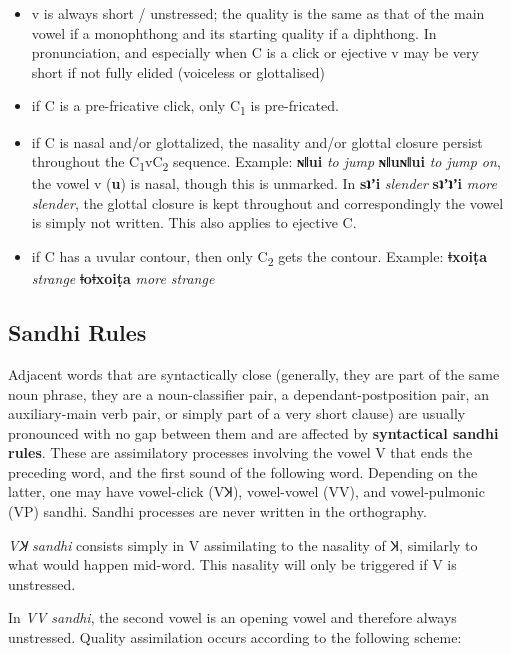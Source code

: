 \documentclass[11pt,a5paper]{book}
\newcommand{\qcn}[1]{\textcolor{AccentText}{\large\textbf{#1}}}
\newcommand{\transl}[2]{\qcn{#1} \emph{#2}}
\begin{document}
\begin{itemize}
	\item v is always short / unstressed; the quality is the same as that of the main vowel if a monophthong and its starting quality if a diphthong. In pronunciation, and especially when C is a click or ejective v may be very short if not fully elided (voiceless or glottalised)
	\item if C is a pre-fricative click, only C\textsubscript{1} is pre-fricated.
	\item if C is nasal and/or glottalized, the nasality and/or glottal closure persist throughout the C\textsubscript{1}vC\textsubscript{2} sequence. Example: \transl{ɴǁui}{to jump} \textrightarrow \transl{ɴǁuɴǁui}{to jump on}, the vowel v (\qcn{u}) is nasal, though this is unmarked. In \transl{sʇʼi}{slender} \textrightarrow \transl{sʇʼʇʼi}{more slender}, the glottal closure is kept throughout and correspondingly the vowel is simply not written. This also applies to ejective C.
	\item if C has a uvular contour, then only C\textsubscript{2} gets the contour. Example: \transl{ǂxoiṭa}{strange} \textrightarrow \transl{ǂoǂxoiṭa}{more strange}
\end{itemize}

\subsection{Sandhi Rules}

Adjacent words that are syntactically close (generally, they are part of the same noun phrase, they are a noun-classifier pair, a de\-pen\-dant-post\-po\-si\-tion pair, an auxiliary-main verb pair, or simply part of a very short clause) are usually pronounced with no gap between them and are affected by \textbf{syntactical sandhi rules}.  These are assimilatory processes involving the vowel V that ends the preceding word, and the first sound of the following word. Depending on the latter, one may have vowel-click (VꞰ), vowel-vowel (VV), and vowel-pulmonic (VP) sandhi. Sandhi processes are never written in the orthography.

\emph{VꞰ sandhi} consists simply in V assimilating to the nasality of Ʞ, similarly to what would happen mid-word. This nasality will only be triggered if V is unstressed.

In \emph{VV sandhi}, the second vowel is an opening vowel and therefore always unstressed. Quality assimilation occurs according to the following scheme:
\end{document}

